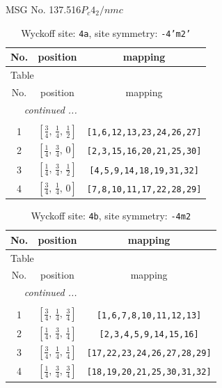 \documentclass[fleqn,8pt]{jsarticle}
\begin{document}
\setcounter{MaxMatrixCols}{32}

\renewcommand{\tablename}{Table~}
\renewcommand{\figurename}{Figure~}
\begin{center}
\LARGE
MSG No. 137.516\quad$P_{c}4_{2}/nmc$
\end{center}
\renewcommand{\arraystretch}{1.2}
\begin{longtable}{ccc}
\caption{Wyckoff site: {\tt 4a}, site symmetry: {\tt -4'm2'}}
 \\
 \hline \hline
No. & position & mapping \\ \hline \endfirsthead

\multicolumn{2}{l}{\tablename\ \thetable{}} \\
 \hline \hline
No. & position & mapping \\ \hline \endhead

 \hline \hline
\multicolumn{2}{r}{\footnotesize\it continued ...} \\ \endfoot

 \hline \hline
\multicolumn{2}{r}{} \\ \endlastfoot

1 & $\left[ \frac{3}{4},\, \frac{1}{4},\, \frac{1}{2} \right]$ & {\tt [1,6,12,13,23,24,26,27]} \\ \hline
2 & $\left[ \frac{1}{4},\, \frac{3}{4},\, 0 \right]$ & {\tt [2,3,15,16,20,21,25,30]} \\ \hline
3 & $\left[ \frac{1}{4},\, \frac{3}{4},\, \frac{1}{2} \right]$ & {\tt [4,5,9,14,18,19,31,32]} \\ \hline
4 & $\left[ \frac{3}{4},\, \frac{1}{4},\, 0 \right]$ & {\tt [7,8,10,11,17,22,28,29]} \\
\end{longtable}
\renewcommand{\arraystretch}{1.2}
\begin{longtable}{ccc}
\caption{Wyckoff site: {\tt 4b}, site symmetry: {\tt -4m2}}
 \\
 \hline \hline
No. & position & mapping \\ \hline \endfirsthead

\multicolumn{2}{l}{\tablename\ \thetable{}} \\
 \hline \hline
No. & position & mapping \\ \hline \endhead

 \hline \hline
\multicolumn{2}{r}{\footnotesize\it continued ...} \\ \endfoot

 \hline \hline
\multicolumn{2}{r}{} \\ \endlastfoot

1 & $\left[ \frac{3}{4},\, \frac{1}{4},\, \frac{3}{4} \right]$ & {\tt [1,6,7,8,10,11,12,13]} \\ \hline
2 & $\left[ \frac{1}{4},\, \frac{3}{4},\, \frac{1}{4} \right]$ & {\tt [2,3,4,5,9,14,15,16]} \\ \hline
3 & $\left[ \frac{3}{4},\, \frac{1}{4},\, \frac{1}{4} \right]$ & {\tt [17,22,23,24,26,27,28,29]} \\ \hline
4 & $\left[ \frac{1}{4},\, \frac{3}{4},\, \frac{3}{4} \right]$ & {\tt [18,19,20,21,25,30,31,32]} \\
\end{longtable}
\end{document}
